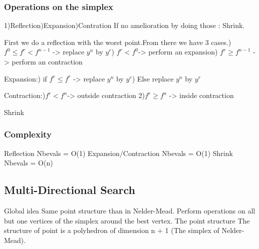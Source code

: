 \subsubsection{Operations on the simplex}
1)Reflection)Expansion)Contration\newline
If no amelioration by doing those : Shrink.\newline

First we do a reflection with the worst point.From there we have 3 cases.) $f^0 \leq f^r < f^{n-1}$ -> replace $y^n$ by $y^r$) $f^r < f^0 $-> perform an expansion) $f^r \geq f^{n-1}$ -> perform an contraction\newline

Expansion:) if $f^e \leq f^r$ -> replace $y^n$ by $y^e$) Else replace $y^n$ by $y^r$\newline

Contraction:)$f^r < f^n$-> outside contraction
2)$f^r \geq f^n$ -> inside contraction

Shrink

\subsubsection{Complexity}
Reflection\newline
Nbevals = O(1)\newline
Expansion/Contraction\newline
Nbevals = O(1)\newline
Shrink\newline
Nbevals = O(n)\newline
\subsection{Multi-Directional Search}
Global idea\newline
Same point structure than in Nelder-Mead.\newline
Perform operations on all but one vertices of the simplex around
the best vertex.\newline
The point structure\newline
\newline
The structure of point is a polyhedron of dimension n + 1 (The
simplex of Nelder-Mead).\newline


